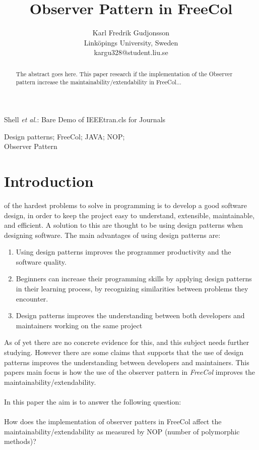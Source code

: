 \documentclass[journal]{IEEEtran}
\begin{document}
\title{Observer Pattern in FreeCol}

\author{Karl Fredrik Gudjonsson\\
        Link\"{o}pings University, Sweden\\
        kargu328@student.liu.se
}
{Shell \MakeLowercase{\textit{et al.}}: Bare Demo of IEEEtran.cls for Journals}

\maketitle
\begin{abstract}
The abstract goes here. This paper research if the implementation of the Observer pattern increase the maintainability/extendability in FreeCol...
\end{abstract}

\begin{IEEEkeywords}
Design patterns; FreeCol; JAVA; NOP;\\ Observer Pattern 
\end{IEEEkeywords}
\IEEEpeerreviewmaketitle
\section{Introduction}
 of the hardest problems to solve in programming is to develop a good software design, in order to keep the project easy to understand, extensible, maintainable, and efficient. A solution to this  are thought to be using design patterns when designing software. The main advantages of using design patterns are\cite{zhang2012we}:
\begin{enumerate}
\item {Using design patterns improves the programmer productivity and the software quality.}
\item{Beginners can increase their programming skills by applying design patterns in their learning process, by recognizing similarities between problems they encounter.}
\item{Design patterns improves the understanding between both developers and maintainers working on the same project}
\end{enumerate}

As of yet there are no concrete evidence for this, and this subject needs further studying. However there are some claims that supports that the use of design patterns improves the understanding between developers and maintainers. This papers main focus is how the use of the observer pattern in \textit{FreeCol} improves the maintainability/extendability.
\\
\\
In this paper the aim is to answer the following question:
\\
\\
How does the implementation of observer patters in FreeCol affect the maintainability/extendability as measured by NOP (number of polymorphic methods)?
\end{document}
